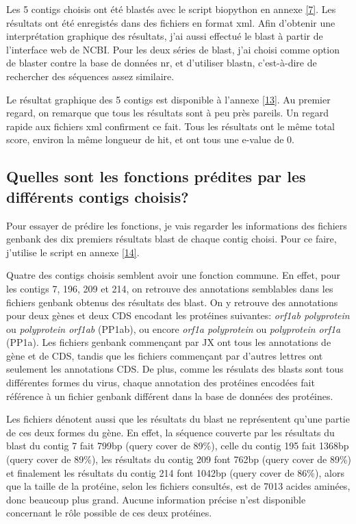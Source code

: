 \documentclass[10.8pt]{article} %
\begin{document}
Les 5 contigs choisis ont été blastés avec le script biopython en annexe \ref{7}. Les résultats ont été enregistés dans des
fichiers en format xml. Afin d'obtenir une interprétation graphique des résultats, j'ai aussi effectué le blast à partir de
l'interface web de NCBI. Pour les deux séries de blast, j'ai choisi comme option de blaster contre la base de données nr, 
et d'utiliser blastn, c'est-à-dire de rechercher des séquences assez similaire.

Le résultat graphique des 5 contigs est disponible à l'annexe \ref{13}. Au premier regard, on remarque que tous les résultats
sont à peu près pareils. Un regard rapide aux fichiers xml confirment ce fait. Tous les résultats ont le même total score,
environ la même longueur de hit, et ont tous une e-value de 0.

\subsection[Fonctions prédites des contigs]{Quelles sont les fonctions prédites par les différents contigs choisis?}

Pour essayer de prédire les fonctions, je vais regarder les informations des fichiers genbank des dix premiers résultats
blast de chaque contig choisi. Pour ce faire, j'utilise le script en annexe \ref{14}.

Quatre des contigs choisis semblent avoir une fonction commune. En effet, pour les contigs 7, 196, 209 et 214, on retrouve
des annotations semblables dans les fichiers genbank obtenus des résultats des blast. On y retrouve des annotations pour deux
gènes et deux CDS encodant les protéines suivantes: \emph{orf1ab polyprotein} ou \emph{polyprotein orf1ab} (PP1ab), ou encore
\emph{orf1a polyprotein} ou \emph{polyprotein orf1a} (PP1a). Les fichiers genbank commençant par JX ont tous les annotations
de gène et de CDS, tandis que les fichiers commençant par d'autres lettres ont seulement les annotations CDS. De plus,
comme les résulats des blasts sont tous différentes formes du virus, chaque annotation des protéines encodées fait référence
à un fichier genbank différent dans la base de données des protéines.

Les fichiers dénotent aussi que les résultats du blast ne représentent qu'une partie de ces deux formes du gène. En effet,
la séquence couverte par les résultats du blast du contig 7 fait 799bp (query cover de 89\%), celle du contig 195 fait
1368bp (query cover de 89\%), les résultats du contig 209 font 762bp (query cover de 89\%) et finalement les résultats du
contig 214 font 1042bp (query cover de 86\%), alors que la taille de la protéine, selon les fichiers consultés, est de
7013 acides aminées, donc beaucoup plus grand. Aucune information précise n'est disponible concernant le rôle possible
de ces deux protéines.
\end{document}
